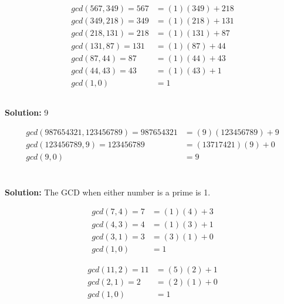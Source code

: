 \documentclass{article}
\begin{document}
\subsection{}

\begin{align*}
   gcd(567, 349) = 567 &= (1)(349) + 218 \\
   gcd(349, 218) = 349 &= (1)(218) + 131 \\
   gcd(218, 131) = 218 &= (1)(131) + 87 \\
   gcd(131, 87) = 131 &= (1)(87) + 44 \\
   gcd(87, 44) = 87 &= (1)(44) + 43 \\
   gcd(44, 43) = 43 &= (1)(43) + 1 \\
   gcd(1, 0) &= 1 
\end{align*}

\subsection{}
\textbf{Solution: } 9

\begin{align*}
   gcd(987654321, 123456789) = 987654321 &= (9)(123456789) + 9 \\
   gcd(123456789, 9) = 123456789 &= (13717421)(9) + 0 \\
   gcd(9, 0) &= 9
\end{align*}

\section{}

\textbf{Solution: } The GCD when either number is a prime is 1.

\begin{align*}
   gcd(7, 4) = 7 &= (1)(4) + 3 \\
   gcd(4, 3) = 4 &= (1)(3) + 1 \\
   gcd(3, 1) = 3 &= (3)(1) + 0 \\
   gcd(1, 0) &= 1 
\end{align*}

\begin{align*}
   gcd(11, 2) = 11 &= (5)(2) + 1 \\
   gcd(2, 1) = 2 &= (2)(1) + 0 \\
   gcd(1, 0) &= 1 
\end{align*}

\section{}
\end{document}

